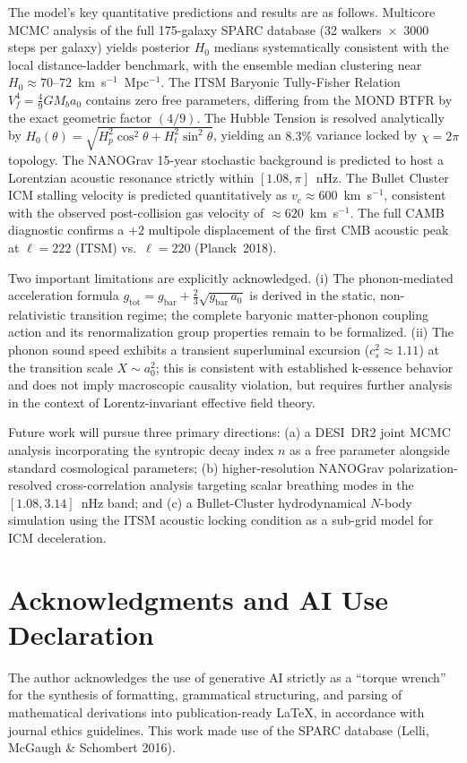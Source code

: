 \documentclass[aps,prd,10pt,onecolumn,superscriptaddress,nofootinbib]{revtex4-2}
\begin{document}
The model's key quantitative predictions and results are as follows. Multicore MCMC analysis of the full 175-galaxy SPARC database (32 walkers~$\times$~3000 steps per galaxy) yields posterior $H_0$ medians systematically consistent with the local distance-ladder benchmark, with the ensemble median clustering near $H_0 \approx 70$--$72$~km~s$^{-1}$~Mpc$^{-1}$. The ITSM Baryonic Tully-Fisher Relation $V_f^4 = \frac{4}{9}G M_b a_0$ contains zero free parameters, differing from the MOND BTFR by the exact geometric factor $(4/9)$. The Hubble Tension is resolved analytically by $H_0(\theta) = \sqrt{H_p^2\cos^2\theta + H_t^2\sin^2\theta}$, yielding an $8.3\%$ variance locked by $\chi = 2\pi$ topology. The NANOGrav 15-year stochastic background is predicted to host a Lorentzian acoustic resonance strictly within $[1.08, \pi]$~nHz. The Bullet Cluster ICM stalling velocity is predicted quantitatively as $v_c \approx 600$~km~s$^{-1}$, consistent with the observed post-collision gas velocity of $\approx 620$~km~s$^{-1}$. The full CAMB diagnostic confirms a $+2$ multipole displacement of the first CMB acoustic peak at $\ell = 222$ (ITSM) vs.~$\ell = 220$ (Planck~2018).

Two important limitations are explicitly acknowledged. (i) The phonon-mediated acceleration formula $g_{\text{tot}} = g_{\text{bar}} + \frac{2}{3}\sqrt{g_{\text{bar}}\,a_0}$ is derived in the static, non-relativistic transition regime; the complete baryonic matter-phonon coupling action and its renormalization group properties remain to be formalized. (ii) The phonon sound speed exhibits a transient superluminal excursion ($c_s^2 \approx 1.11$) at the transition scale $X \sim a_0^2$; this is consistent with established k-essence behavior \cite{babichev_cs2} and does not imply macroscopic causality violation, but requires further analysis in the context of Lorentz-invariant effective field theory.

Future work will pursue three primary directions: (a) a DESI~DR2 joint MCMC analysis incorporating the syntropic decay index $n$ as a free parameter alongside standard cosmological parameters; (b) higher-resolution NANOGrav polarization-resolved cross-correlation analysis targeting scalar breathing modes in the $[1.08, 3.14]$~nHz band; and (c) a Bullet-Cluster hydrodynamical $N$-body simulation using the ITSM acoustic locking condition as a sub-grid model for ICM deceleration.

\section*{Acknowledgments and AI Use Declaration}
The author acknowledges the use of generative AI strictly as a ``torque wrench'' for the synthesis of formatting, grammatical structuring, and parsing of mathematical derivations into publication-ready LaTeX, in accordance with journal ethics guidelines. This work made use of the SPARC database (Lelli, McGaugh \& Schombert 2016).
\end{document}
